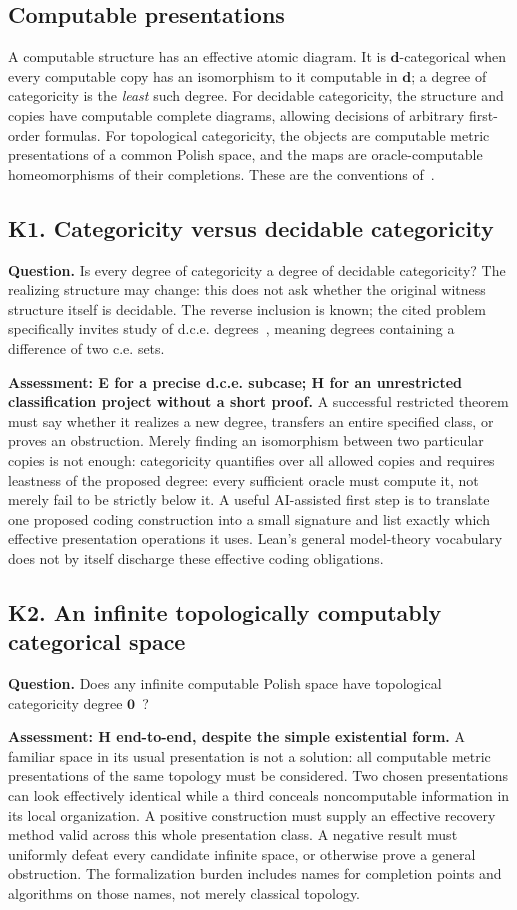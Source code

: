 \documentclass[11pt,a4paper]{article}
\newcommand{\problem}[2]{\subsection{#1. #2}\label{entry:#1}}
\theoremstyle{definition}\newtheorem{definition}[theorem]{Definition}
\theoremstyle{remark}\newtheorem{remark}[theorem]{Remark}
\begin{document}
\subsection{Computable presentations}
A computable structure has an effective atomic diagram. It is
$\mathbf d$-categorical when every computable copy has an isomorphism to it
computable in $\mathbf d$; a degree of categoricity is the \emph{least} such
degree. For decidable categoricity, the structure and copies have computable
complete diagrams, allowing decisions of arbitrary first-order formulas.
For topological categoricity, the objects are computable metric presentations
of a common Polish space, and the maps are oracle-computable homeomorphisms
of their completions. These are the conventions of~\cite{Workshop25}.

\problem{K1}{Categoricity versus decidable categoricity}
\textbf{Question.} Is every degree of categoricity a degree of decidable
categoricity? The realizing structure may change: this does not ask whether the original witness structure itself is decidable. The reverse inclusion is known; the cited problem specifically
invites study of d.c.e. degrees~\cite{Workshop25}, meaning degrees containing a
difference of two c.e. sets.

\textbf{Assessment: E for a precise d.c.e. subcase; H for an unrestricted
classification project without a short proof.} A successful restricted theorem
must say whether it realizes a new degree, transfers an entire specified class,
or proves an obstruction. Merely finding an isomorphism between two particular
copies is not enough: categoricity quantifies over all allowed copies and
requires leastness of the proposed degree: every sufficient oracle must compute it, not merely fail to be strictly below it. A useful AI-assisted first step is
to translate one proposed coding construction into a small signature and list
exactly which effective presentation operations it uses. Lean's general
model-theory vocabulary does not by itself discharge these effective coding
obligations.

\problem{K2}{An infinite topologically computably categorical space}
\textbf{Question.} Does any infinite computable Polish space have topological
categoricity degree $\mathbf0$~\cite{Workshop25}?

\textbf{Assessment: H end-to-end, despite the simple existential form.}
A familiar space in its usual presentation is not a solution: all computable
metric presentations of the same topology must be considered. Two chosen
presentations can look effectively identical while a third conceals
noncomputable information in its local organization. A positive construction
must supply an effective recovery method valid across this whole presentation
class. A negative result must uniformly defeat every candidate infinite space,
or otherwise prove a general obstruction. The formalization burden includes
names for completion points and algorithms on those names, not merely
classical topology.
\end{document}
